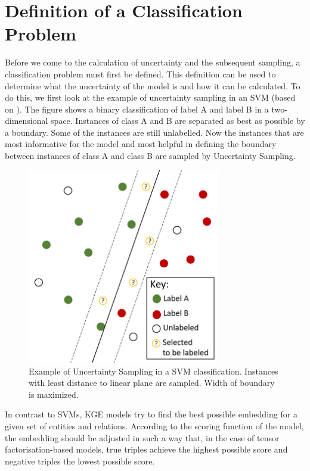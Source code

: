\section{Definition of a Classification Problem}
\label{sec:definition_of_a_classification_problem}

Before we come to the calculation of uncertainty and the subsequent sampling, a classification problem must first be defined.
This definition can be used to determine what the uncertainty of the model is and how it can be calculated.
To do this, we first look at the example of  uncertainty sampling in an \ac{SVM} (based on \cite{human-in-the-loop}).
The figure shows a binary classification of label A and label B in  a two-dimensional space.
Instances of class A and B are separated as best as possible by a boundary.
Some of the instances are still unlabelled.
Now the instances that are most informative for the model and most helpful in defining the boundary between instances of class A and class B are sampled by Uncertainty Sampling.
\begin{figure}[t]
  \centering
    \includegraphics[width=0.75\textwidth]{figures/SVM.pdf}
  \caption{Example of Uncertainty Sampling in a \ac{SVM} classification. Instances with least distance to linear plane are sampled. Width of boundary is maximized.}
  \label{fig:svm}
\end{figure}
In contrast to \acp{SVM}, \ac{KGE} models try to find the best possible embedding for a given set of entities and relations.
According to the scoring function of the model, the embedding should be adjusted in such a way that, in the case of tensor factorisation-based models, true triples achieve the highest possible score and negative triples the lowest possible score.
